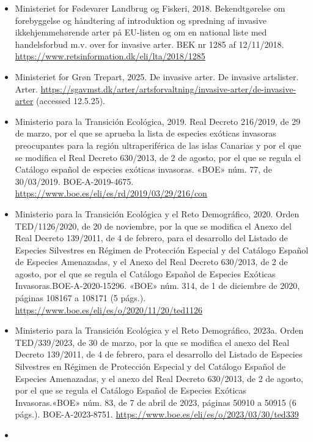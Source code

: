 \documentclass[
]{article}
\begin{document}
\begin{itemize}
  JORF n°0118 du 14 mai 2020, Texte n° 7. NOR : TREL1924265A.
  \url{https://www.legifrance.gouv.fr/jorf/id/JORFTEXT000041875937}
\item
  Ministeriet for Fødevarer Landbrug og Fiskeri, 2018. Bekendtgørelse om
  forebyggelse og håndtering af introduktion og spredning af invasive
  ikkehjemmehørende arter på EU-listen og om en national liste med
  handelsforbud m.v. over for invasive arter. BEK nr 1285 af 12/11/2018.
  \url{https://www.retsinformation.dk/eli/lta/2018/1285}
\item
  Ministeriet for Grøn Trepart, 2025. De invasive arter. De invasive
  artslister. Arter.
  \url{https://sgavmst.dk/arter/artsforvaltning/invasive-arter/de-invasive-arter}
  (accessed 12.5.25).
\item
  Ministerio para la Transición Ecológica, 2019. Real Decreto 216/2019,
  de 29 de marzo, por el que se aprueba la lista de especies exóticas
  invasoras preocupantes para la región ultraperiférica de las islas
  Canarias y por el que se modifica el Real Decreto 630/2013, de 2 de
  agosto, por el que se regula el Catálogo español de especies exóticas
  invasoras. «BOE» núm. 77, de 30/03/2019. BOE-A-2019-4675.
  \url{https://www.boe.es/eli/es/rd/2019/03/29/216/con}
\item
  Ministerio para la Transición Ecológica y el Reto Demográfico, 2020.
  Orden TED/1126/2020, de 20 de noviembre, por la que se modifica el
  Anexo del Real Decreto 139/2011, de 4 de febrero, para el desarrollo
  del Listado de Especies Silvestres en Régimen de Protección Especial y
  del Catálogo Español de Especies Amenazadas, y el Anexo del Real
  Decreto 630/2013, de 2 de agosto, por el que se regula el Catálogo
  Español de Especies Exóticas Invasoras.BOE-A-2020-15296. «BOE» núm.
  314, de 1 de diciembre de 2020, páginas 108167 a 108171 (5 págs.).
  \url{https://www.boe.es/eli/es/o/2020/11/20/ted1126}
\item
  Ministerio para la Transición Ecológica y el Reto Demográfico, 2023a.
  Orden TED/339/2023, de 30 de marzo, por la que se modifica el anexo
  del Real Decreto 139/2011, de 4 de febrero, para el desarrollo del
  Listado de Especies Silvestres en Régimen de Protección Especial y del
  Catálogo Español de Especies Amenazadas, y el anexo del Real Decreto
  630/2013, de 2 de agosto, por el que se regula el Catálogo Español de
  Especies Exóticas Invasoras.«BOE» núm. 83, de 7 de abril de 2023,
  páginas 50910 a 50915 (6 págs.). BOE-A-2023-8751.
  \url{https://www.boe.es/eli/es/o/2023/03/30/ted339}
\item

\end{itemize}
\end{document}
